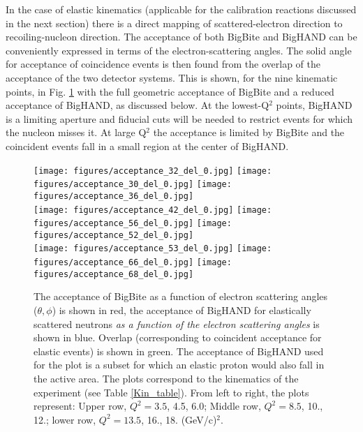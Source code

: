\documentclass[12pt,letterpaper,oneside]{article}
\begin{document}
In the case of elastic kinematics (applicable for the calibration
reactions discussed in the next section) there is a direct mapping of
scattered-electron direction to recoiling-nucleon direction.  The
acceptance of both BigBite and BigHAND can be conveniently expressed
in terms of the electron-scattering angles.  The solid angle for
acceptance of coincidence events is then found from the overlap of
the acceptance of the two detector systems.  This is shown,
for the nine kinematic points, in 
Fig. \ref{Theta-Phi-accept} with the full geometric acceptance of
BigBite and a reduced acceptance of BigHAND, as discussed below.
At the lowest-Q$^2$ points, BigHAND is a limiting aperture and
fiducial cuts will be needed to restrict events for which the nucleon
misses it.  At large Q$^2$ the acceptance is limited by BigBite and
the coincident events fall in a small region at the center of BigHAND.


\begin{figure}
\texttt{[image: figures/acceptance\_32\_del\_0.jpg]}\hfill
\texttt{[image: figures/acceptance\_30\_del\_0.jpg]}\hfill
\texttt{[image: figures/acceptance\_36\_del\_0.jpg]}\\
\texttt{[image: figures/acceptance\_42\_del\_0.jpg]}\hfill
\texttt{[image: figures/acceptance\_56\_del\_0.jpg]}\hfill
\texttt{[image: figures/acceptance\_52\_del\_0.jpg]}\\
\texttt{[image: figures/acceptance\_53\_del\_0.jpg]}\hfill
\texttt{[image: figures/acceptance\_66\_del\_0.jpg]}\hfill
\texttt{[image: figures/acceptance\_68\_del\_0.jpg]}\\
\caption{\label{Theta-Phi-accept}
The acceptance of BigBite as a function of electron scattering angles
($\theta,\phi$) is shown in red, the acceptance of
BigHAND for elastically scattered neutrons {\em as a function of the
electron scattering angles} is shown in blue.  Overlap
(corresponding to coincident acceptance for elastic events) is shown
in green.  
The acceptance of BigHAND used for the plot is a subset for which
an elastic proton would also fall in the active area.
The plots 
correspond to the kinematics of the experiment (see Table
\ref{Kin_table}).  From left to right, the plots represent: Upper
row, $Q^2=3.5$, 4.5, 6.0; Middle row, $Q^2=8.5$, 10., 12.; 
lower row, $Q^2=13.5$, 16., 18. (GeV/c)$^2$.}
\end{figure}

\end{document}
